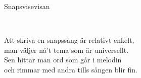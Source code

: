 \begin{song}{Snapsvisevisan}

\\

Att skriva en snapssång är relativt enkelt,\\
man väljer nå't tema som är universellt.\\
Sen hittar man ord som går i melodin\\
och rimmar med andra tills sången blir fin.

\end{song}